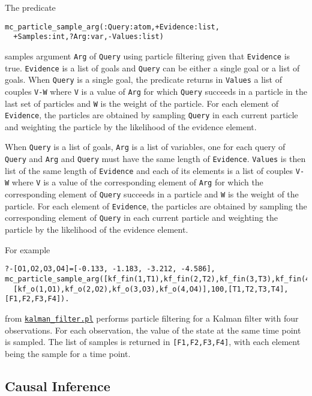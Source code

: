The predicate
\begin{verbatim}
mc_particle_sample_arg(:Query:atom,+Evidence:list,
  +Samples:int,?Arg:var,-Values:list) 
\end{verbatim}
samples argument \verb|Arg| of \verb|Query| using particle filtering 
given that 
\verb|Evidence|
is true. \verb|Evidence| is a list of goals and \verb|Query| can be either
a single goal or a list of goals.
When \verb|Query| is a single goal, the predicate returns in \verb|Values| a list of couples \verb|V-W| where
\verb|V| is a value of \verb|Arg| for which \verb|Query| succeeds in
a particle in the last set of particles and \verb|W| is the weight of the particle.
For each element of \verb|Evidence|, the particles are obtained by sampling \verb|Query|
in each current particle and weighting the particle by the likelihood of the evidence element.

When \verb|Query| is a list of goals,  \verb|Arg| is a list of variables, one for 
each query of \verb|Query| and \verb|Arg| and \verb|Query| must have the same length of \verb|Evidence|.
\verb|Values| is then list of the same length of \verb|Evidence| and each of its
elements is a list of couples \verb|V-W| where
\verb|V| is a value of the corresponding element of \verb|Arg| for which the corresponding element of
\verb|Query| succeeds in
a particle and \verb|W| is the weight of the particle.
For each element of \verb|Evidence|, the particles are obtained by sampling the corresponding element of \verb|Query|
in each current particle and weighting the particle by the likelihood of the evidence element.


For example
\begin{verbatim}
?-[O1,O2,O3,O4]=[-0.133, -1.183, -3.212, -4.586],
mc_particle_sample_arg([kf_fin(1,T1),kf_fin(2,T2),kf_fin(3,T3),kf_fin(4,T4)],
  [kf_o(1,O1),kf_o(2,O2),kf_o(3,O3),kf_o(4,O4)],100,[T1,T2,T3,T4],[F1,F2,F3,F4]).
\end{verbatim}
from \href{http://cplint.lamping.unife.it/example/inference/kalman_filter.pl}{\texttt{kalman\_filter.pl}} performs
particle filtering for a Kalman filter with four observations. For each observation, the value of the state 
at the same time point is sampled. The list of samples is returned in \verb|[F1,F2,F3,F4]|, with each element
being the sample for a time point. 

\subsection{Causal Inference}
\label{causal}

